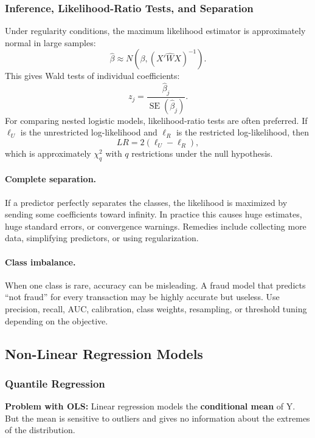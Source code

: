 \documentclass[12pt,openany]{book}
\begin{document}
\subsubsection{Inference, Likelihood-Ratio Tests, and Separation}

Under regularity conditions, the maximum likelihood estimator is approximately normal in large samples:
\[
\hat{\beta}\approx N\left(\beta,(X'\hat{W}X)^{-1}\right).
\]
This gives Wald tests of individual coefficients:
\[
z_j=\frac{\hat{\beta}_j}{\operatorname{SE}(\hat{\beta}_j)}.
\]
For comparing nested logistic models, likelihood-ratio tests are often preferred. If \(\ell_U\) is the unrestricted log-likelihood and \(\ell_R\) is the restricted log-likelihood, then
\[
LR=2(\ell_U-\ell_R),
\]
which is approximately \(\chi^2_q\) with \(q\) restrictions under the null hypothesis.

\paragraph{Complete separation.}
If a predictor perfectly separates the classes, the likelihood is maximized by sending some coefficients toward infinity. In practice this causes huge estimates, huge standard errors, or convergence warnings. Remedies include collecting more data, simplifying predictors, or using regularization.

\paragraph{Class imbalance.}
When one class is rare, accuracy can be misleading. A fraud model that predicts ``not fraud'' for every transaction may be highly accurate but useless. Use precision, recall, AUC, calibration, class weights, resampling, or threshold tuning depending on the objective.

\subsection{Non-Linear Regression Models}


\subsubsection{Quantile Regression}


\textbf{Problem with OLS:} Linear regression models the \textbf{conditional mean} of Y. But the mean is sensitive to outliers and gives no information about the extremes of the distribution.
\end{document}
